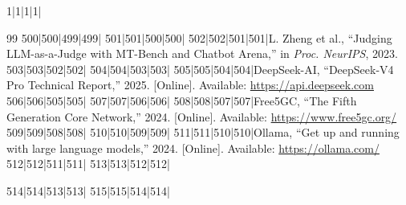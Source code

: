 1|1|1|1|\documentclass[10pt,conference]{IEEEtran}
\begin{document}
\begin{thebibliography}{99}
500|500|499|499|
501|501|500|500|
502|502|501|501|L. Zheng et al., ``Judging LLM-as-a-Judge with MT-Bench and Chatbot Arena,'' in \textit{Proc. NeurIPS}, 2023.
503|503|502|502|
504|504|503|503|
505|505|504|504|DeepSeek-AI, ``DeepSeek-V4 Pro Technical Report,'' 2025. [Online]. Available: \url{https://api.deepseek.com}
506|506|505|505|
507|507|506|506|
508|508|507|507|Free5GC, ``The Fifth Generation Core Network,'' 2024. [Online]. Available: \url{https://www.free5gc.org/}
509|509|508|508|
510|510|509|509|
511|511|510|510|Ollama, ``Get up and running with large language models,'' 2024. [Online]. Available: \url{https://ollama.com/}
512|512|511|511|
513|513|512|512|\end{thebibliography}
514|514|513|513|
515|515|514|514|
\end{document}
